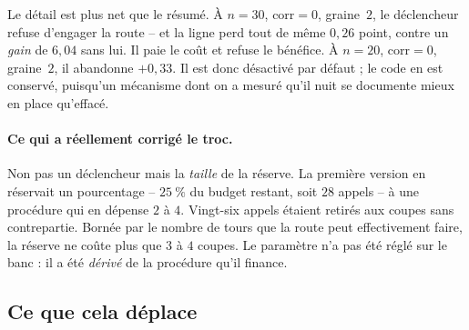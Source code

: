 \documentclass[11pt,a4paper]{article}
\theoremstyle{plain}
\theoremstyle{remark}
\begin{document}
Le détail est plus net que le résumé. À $n=30$, $\text{corr}=0$, graine~$2$,
le déclencheur refuse d'engager la route -- et la ligne perd tout de même
$0{,}26$ point, contre un \emph{gain} de $6{,}04$ sans lui. Il paie le coût
et refuse le bénéfice. À $n=20$, $\text{corr}=0$, graine~$2$, il abandonne
$+0{,}33$. Il est donc désactivé par défaut ; le code en est conservé,
puisqu'un mécanisme dont on a mesuré qu'il nuit se documente mieux en place
qu'effacé.

\paragraph{Ce qui a réellement corrigé le troc.} Non pas un déclencheur mais
la \emph{taille} de la réserve. La première version en réservait un
pourcentage -- $25\ \%$ du budget restant, soit $28$ appels -- à une
procédure qui en dépense $2$ à $4$. Vingt-six appels étaient retirés aux
coupes sans contrepartie. Bornée par le nombre de tours que la route peut
effectivement faire, la réserve ne coûte plus que $3$ à $4$ coupes. Le
paramètre n'a pas été réglé sur le banc : il a été \emph{dérivé} de la
procédure qu'il finance.

\subsection{Ce que cela déplace}
\end{document}
